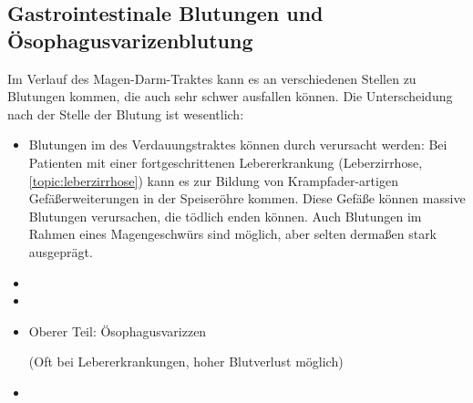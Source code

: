 \subsection{Gastrointestinale
Blutungen und Ösophagusvarizenblutung}
\label{topic:oesophagusvarizenblutung}%
\label{topic:gastrointestinale-blutung}%


{%
 Im Verlauf des Magen-Darm-Traktes kann es an verschiedenen
Stellen zu Blutungen kommen, die auch sehr schwer ausfallen
können. Die Unterscheidung nach der Stelle der Blutung ist
wesentlich:
\begin{itemize}
  \item Blutungen im  des Verdauungstraktes können
  durch
  verursacht werden: Bei Patienten
  mit einer fortgeschrittenen Lebererkrankung (Leberzirrhose, 
  \ref{topic:leberzirrhose}) kann es zur Bildung von 
  Krampfader-artigen Gefäßerweiterungen in der Speiseröhre
  kommen. Diese Gefäße können massive Blutungen verursachen,
  die tödlich enden können. Auch Blutungen im Rahmen eines
  Magengeschwürs sind möglich, aber selten dermaßen stark
  ausgeprägt.
  \item {}
  \item {}
\end{itemize}




}
{
\begin{itemize}
    \item Oberer Teil: Ösophagusvarizzen
    
    (Oft bei
    Lebererkrankungen, hoher Blutverlust möglich)
    \item {}
\end{itemize}
}{}{}{}

